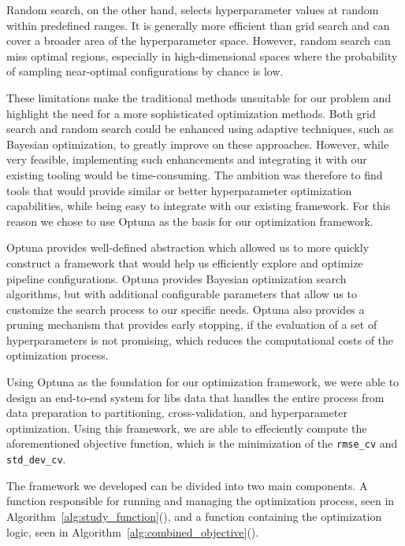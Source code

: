 Random search, on the other hand, selects hyperparameter values at random within predefined ranges. 
It is generally more efficient than grid search and can cover a broader area of the hyperparameter space. 
However, random search can miss optimal regions, especially in high-dimensional spaces where the probability of sampling near-optimal configurations by chance is low. 

These limitations make the traditional methods unsuitable for our problem and highlight the need for a more sophisticated optimization methods.
Both grid search and random search could be enhanced using adaptive techniques, such as Bayesian optimization, to greatly improve on these approaches.
However, while very feasible, implementing such enhancements and integrating it with our existing tooling would be time-consuming.
The ambition was therefore to find tools that would provide similar or better hyperparameter optimization capabilities, while being easy to integrate with our existing framework.
For this reason we chose to use Optuna as the basis for our optimization framework.

Optuna provides well-defined abstraction which allowed us to more quickly construct a framework that would help us efficiently explore and optimize pipeline configurations.\cite{optuna_2019}
Optuna provides Bayesian optimization search algorithms, but with additional configurable parameters that allow us to customize the search process to our specific needs.
Optuna also provides a pruning mechanism that provides early stopping, if the evaluation of a set of hyperparameters is not promising, which reduces the computational costs of the optimization process.

Using Optuna as the foundation for our optimization framework, we were able to design an end-to-end system for \gls{libs} data that handles the entire process from data preparation to partitioning, cross-validation, and hyperparameter optimization.
Using this framework, we are able to effeciently compute the aforementioned objective function, which is the minimization of the \texttt{rmse\_cv} and \texttt{std\_dev\_cv}.

The framework we developed can be divided into two main components.
A function responsible for running and managing the optimization process, seen in Algorithm~\ref{alg:study_function}(), and a function containing the optimization logic, seen in Algorithm~\ref{alg:combined_objective}().


